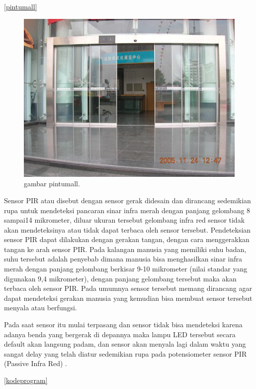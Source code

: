 \ref{pintumall}

\begin{figure}[ht]
\centerline{\includegraphics[width=1\textwidth]{figures/pintumall.JPG}}
\caption{gambar pintumall.}
\label{pintumall.JPG}
\end{figure}

Sensor PIR atau disebut dengan sensor gerak didesain dan dirancang sedemikian rupa untuk mendeteksi pancaran sinar infra merah dengan panjang gelombang 8 sampai14 mikrometer, diluar ukuran tersebut gelombang infra red sensor tidak akan mendeteksinya atau tidak dapat terbaca oleh sensor tersebut. Pendeteksian sensor PIR  dapat dilakukan dengan gerakan tangan, dengan cara menggerakkan tangan ke arah sensor PIR.
Pada kalangan manusia yang memiliki suhu badan, suhu tersebut adalah penyebab dimana manusia bisa menghasilkan sinar infra merah dengan panjang gelombang berkisar 9-10 mikrometer (nilai standar yang digunakan 9,4 mikrometer), dengan panjang gelombang tersebut maka akan terbaca oleh sensor PIR. Pada umumnya sensor tersebut memang dirancang agar dapat mendeteksi gerakan manusia yang kemudian bisa membuat sensor tersebut menyala atau berfungsi.

Pada saat sensor itu mulai terpasang dan sensor tidak bisa mendeteksi karena adanya benda yang bergerak di depannya maka lampu LED tersebut secara default akan langsung padam, dan sensor akan menyala lagi dalam waktu yang sangat delay yang telah diatur sedemikian rupa pada potensiometer sensor PIR (Passive Infra Red) .

\ref{kodeprogram}

